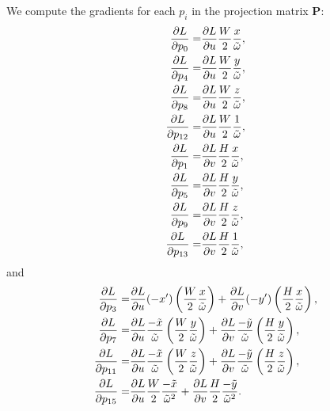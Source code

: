 We compute the gradients for each $p_i$ in the projection matrix $\textbf{P}$:
\begin{equation}
    \begin{aligned}
        \frac{\partial L}{\partial p_0} =& \frac{\partial L}{\partial u}\frac{W}{2}\frac{x}{\Tilde{\omega}},\\
        \frac{\partial L}{\partial p_4} =& \frac{\partial L}{\partial u}\frac{W}{2}\frac{y}{\Tilde{\omega}},\\
        \frac{\partial L}{\partial p_8} =& \frac{\partial L}{\partial u}\frac{W}{2}\frac{z}{\Tilde{\omega}},\\
        \frac{\partial L}{\partial p_{12}} =& \frac{\partial L}{\partial u}\frac{W}{2}\frac{1}{\Tilde{\omega}},\\        
        \frac{\partial L}{\partial p_1} =& \frac{\partial L}{\partial v}\frac{H}{2}\frac{x}{\Tilde{\omega}},\\
        \frac{\partial L}{\partial p_5} =& \frac{\partial L}{\partial v}\frac{H}{2}\frac{y}{\Tilde{\omega}},\\
        \frac{\partial L}{\partial p_9} =& \frac{\partial L}{\partial v}\frac{H}{2}\frac{z}{\Tilde{\omega}},\\
        \frac{\partial L}{\partial p_{13}} =& \frac{\partial L}{\partial v}\frac{H}{2}\frac{1}{\Tilde{\omega}},
    \end{aligned}
\end{equation}
and
\begin{equation}
    \begin{aligned}
        \frac{\partial L}{\partial p_3}=&\frac{\partial L}{\partial u}(-x')\left(\frac{W}{2}\frac{x}{\Tilde{\omega}}\right)+\frac{\partial L}{\partial v}(-y')\left(\frac{H}{2}\frac{x}{\Tilde{\omega}}\right),\\
        \frac{\partial L}{\partial p_7}=&\frac{\partial L}{\partial u}\frac{-\Tilde{x}}{\Tilde{\omega}}\left(\frac{W}{2}\frac{y}{\Tilde{\omega}}\right)+\frac{\partial L}{\partial v}\frac{-\Tilde{y}}{\Tilde{\omega}}\left(\frac{H}{2}\frac{y}{\Tilde{\omega}}\right),\\
        \frac{\partial L}{\partial p_{11}}=& \frac{\partial L}{\partial u}\frac{-\Tilde{x}}{\Tilde{\omega}}\left(\frac{W}{2}\frac{z}{\Tilde{\omega}}\right)+\frac{\partial L}{\partial v}\frac{-\Tilde{y}}{\Tilde{\omega}}\left(\frac{H}{2}\frac{z}{\Tilde{\omega}}\right),\\
        \frac{\partial L}{\partial p_{15}}=&\frac{\partial L}{\partial u}\frac{W}{2}\frac{-\Tilde{x}}{\Tilde{\omega}^2}+\frac{\partial L}{\partial v}\frac{H}{2}\frac{-\Tilde{y}}{\Tilde{\omega}^2}.
    \end{aligned}
\end{equation}


